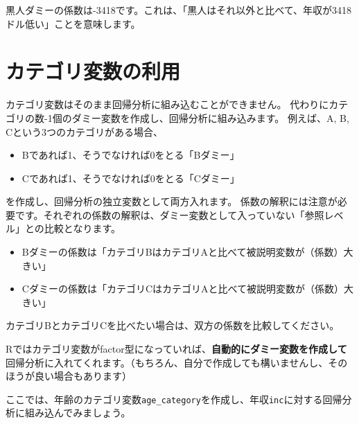 \documentclass[
]{book}
\providecommand{\tightlist}{%
  \setlength{\itemsep}{0pt}\setlength{\parskip}{0pt}}
\begin{document}
黒人ダミーの係数は-3418です。これは、「黒人はそれ以外と比べて、年収が3418ドル低い」ことを意味します。

\hypertarget{ux30abux30c6ux30b4ux30eaux5909ux6570ux306eux5229ux7528}{%
\section{カテゴリ変数の利用}\label{ux30abux30c6ux30b4ux30eaux5909ux6570ux306eux5229ux7528}}

カテゴリ変数はそのまま回帰分析に組み込むことができません。
代わりにカテゴリの数-1個のダミー変数を作成し、回帰分析に組み込みます。
例えば、A, B, Cという3つのカテゴリがある場合、

\begin{itemize}
\tightlist
\item
  Bであれば1、そうでなければ0をとる「Bダミー」
\item
  Cであれば1、そうでなければ0をとる「Cダミー」
\end{itemize}

を作成し、回帰分析の独立変数として両方入れます。
係数の解釈には注意が必要です。それぞれの係数の解釈は、ダミー変数として入っていない「参照レベル」との比較となります。

\begin{itemize}
\tightlist
\item
  Bダミーの係数は「カテゴリBはカテゴリAと比べて被説明変数が（係数）大きい」
\item
  Cダミーの係数は「カテゴリCはカテゴリAと比べて被説明変数が（係数）大きい」
\end{itemize}

カテゴリBとカテゴリCを比べたい場合は、双方の係数を比較してください。

Rではカテゴリ変数がfactor型になっていれば、\textbf{自動的にダミー変数を作成して}回帰分析に入れてくれます。（もちろん、自分で作成しても構いませんし、そのほうが良い場合もあります）

ここでは、年齢のカテゴリ変数\texttt{age\_category}を作成し、年収\texttt{inc}に対する回帰分析に組み込んでみましょう。
\end{document}
